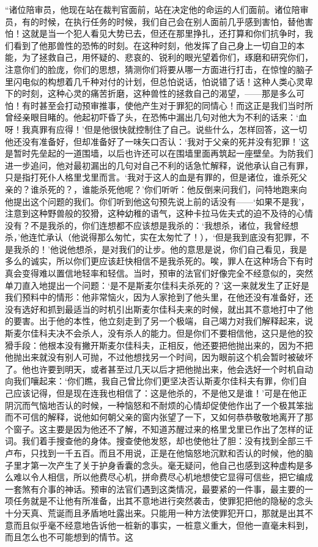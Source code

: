 \par “诸位陪审员，他现在站在裁判官面前，站在决定他的命运的人们面前。诸位陪审员，有的时候，在执行任务的时候，我们自己会在别人面前几乎感到害怕，替他害怕！这就是当一个犯人看见大势已去，但还在那里挣扎，还打算和你们抗争时，我们看到了他那兽性的恐怖的时刻。在这种时刻，他发挥了自己身上一切自卫的本能，为了拯救自己，用怀疑的、悲哀的、锐利的眼光望着你们，琢磨和研究你们，注意你们的脸庞，你们的思想，猜测你们将要从哪一方面进行打击，在惊惶的脑子里闪电似的构想着几千种对付的计划，但总怕说话，怕说错了话！这种人类心灵卑下的时刻，这种心灵的痛苦折磨，这种兽性的拯救自己的渴望，——那是多么可怕！有时甚至会打动预审推事，使他产生对于罪犯的同情心！而这正是我们当时所曾经亲眼目睹的。他起初吓昏了头，在恐怖中漏出几句对他大为不利的话来：‘血呀！我真罪有应得！’但是他很快就控制住了自己。说些什么，怎样回答，这一切他还没有准备好，但却准备好了一味矢口否认：‘我对于父亲的死并没有犯罪！’这是暂时先垒起的一道围墙，以后也许还可以在围墙里面再筑起一座壁垒。为防我们进一步追问，他对最初漏出的几句对自己不利的话急忙解释，说他承认自己有罪，只是指打死仆人格里戈里而言。‘我对于这人的血是有罪的，但是诸位，谁杀死父亲的？谁杀死的？，谁能杀死他呢？’你们听听：他反倒来问我们，问特地跑来向他提出这个问题的我们。你们听到他这句预先说上前的话没有——‘如果不是我’，注意到这种野兽般的狡猾，这种幼稚的语气，这种卡拉马佐夫式的迫不及待的心情没有？不是我杀的，你们连想都不应该想是我杀的：‘我想杀，诸位，我曾经想杀，’他连忙承认（他说得那么匆忙，实在太匆忙了！），‘但是我到底没有犯罪，不是我杀的！’他说他想杀，是对我们的让步。他的意思是说，你们自己看见，我是多么的诚实，所以你们更应该赶快相信不是我杀死的。唉，罪人在这种场合下有时真会变得难以置信地轻率和轻信。当时，预审的法官们好像完全不经意似的，突然单刀直入地提出一个问题：‘是不是斯麦尔佳科夫杀死的？’这一来就发生了正好是我们预料中的情形：他非常恼火，因为人家抢到了他头里，在他还没有准备好，还没有选好和抓到最适当的时机引出斯麦尔佳科夫来的时候，就出其不意地打中了他的要害。出于他的本性，他立刻走到了另一个极端，自己竭力对我们解释起来，说斯麦尔佳科夫决不会杀人，没有杀人的能力。但是你们不要相信他，这只是他的狡猾手段：他根本没有撇开斯麦尔佳科夫，正相反，他还要把他抛出来的，因为不把他抛出来就没有别人可抛，不过他想找另一个时间，因为眼前这个机会暂时被破坏了。他也许要到明天，或者甚至过几天以后才把他抛出来，他会选好一个时机自动向我们嚷起来：‘你们瞧，我自己曾比你们更坚决否认斯麦尔佳科夫有罪，你们自己应该记得，但是现在连我也相信了：这是他杀的，不是他又是谁！’可是在他正阴沉而气恼地否认的时候，一种恼怒和不耐烦的心情却促使他作出了一个极其笨拙而不可信的解释，说他如何朝父亲的窗内张望了一下，又如何恭恭敬敬地离开了那个窗子。这主要是因为他还不了解，不知道苏醒过来的格里戈里已作出了怎样的证词。我们着手搜查他的身体。搜查使他发怒，却也使他壮了胆：没有找到全部三千卢布，只找到一千五百。而且不用说，正是在他恼怒地沉默和否认的时候，他的脑子里才第一次产生了关于护身香囊的念头。毫无疑问，他自己也感到这种虚构是多么难以令人相信，所以他费尽心机，拼命费尽心机地想使它显得可信些，把它编成一套煞有介事的神话。预审的法官们遇到这类情况，最要紧的一件事，最主要的一项任务就是不让他有所准备，出其不意地进行突然袭击，使罪犯把他的隐秘的念头十分天真、荒诞而且矛盾地吐露出来。只能用一种方法使罪犯开口，那就是出其不意而且似乎毫不经意地告诉他一桩新的事实，一桩意义重大，但他一直毫未料到，而且怎么也不可能想到的情节。这